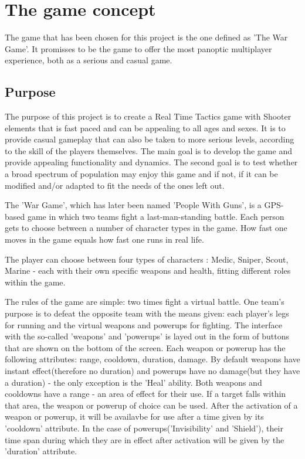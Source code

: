 \documentclass{article}
\begin{document}
\section{The game concept}

The game that has been chosen for this project is the one defined as 'The War
Game'. It promisses to be the game to offer the most panoptic multiplayer
experience, both as a serious and casual game.\newline

\subsection{Purpose}

The purpose of this project is to create a Real Time Tactics game with Shooter
elements that is fast paced and can be appealing to all ages and sexes. It is to
provide casual gameplay that can also be taken to more serious levels, according
to the skill of the players themselves. The main goal is to develop the game and
provide appealing functionality and dynamics. The second goal is to test whether
a broad spectrum of population may enjoy this game and if not, if it can be
modified and/or adapted to fit the needs of the ones left out.\newline

The 'War Game', which has later been named 'People With Guns', is a GPS-based
game in which two teams fight a last-man-standing battle. Each person gets to
choose between a number of character types in the game. How fast one moves in
the game equals how fast one runs in real life.\newline

The player can choose between four types of characters : Medic, Sniper, Scout,
Marine - each with their own specific weapons and health, fitting different
roles within the game.\newline

The rules of the game are simple: two times fight a virtual battle. One team's
purpose is to defeat the opposite team with the means given: each player's legs
for running and the virtual weapons and powerups for fighting. The interface
with the so-called 'weapons' and 'powerups' is layed out in the form of buttons
that are shown on the bottom of the screen. Each weapon or powerup has the
following attributes: range, cooldown, duration, damage. By default weapons have
instant effect(therefore no duration) and powerups have no damage(but they have
a duration) - the only exception is the 'Heal' ability. Both weapons and
cooldowns have a range - an area of effect for their use. If a target falls
within that area, the weapon or powerup of choice can be used. After the
activation of a weapon or powerup, it will be availavbe for use after a time
given by its 'cooldown' attribute. In the case of powerups('Invisibility' and
'Shield'), their time span during which they are in effect after activation will
be given by the 'duration' attribute. \newline
\end{document}
